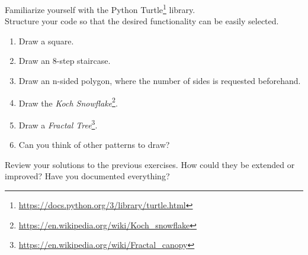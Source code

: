 \documentclass{config/minimal_uebungszettel}
\theoremstyle{definition}
\newcommand{\furl}[1]{\footnote{\url{#1}}}
\begin{document}
\medskip
\noindent {} \quad


    \noindent Familiarize yourself with the Python Turtle\furl{https://docs.python.org/3/library/turtle.html} library.\\
    Structure your code so that the desired functionality can be easily selected.
    \begin{enumerate}
        \item Draw a square.
        \item Draw an 8-step staircase.
        \item Draw an n-sided polygon, where the number of sides is requested beforehand.
        \item Draw the \textsl{Koch Snowflake}\furl{https://en.wikipedia.org/wiki/Koch_snowflake}.
        \item Draw a \textsl{Fractal Tree}\furl{https://en.wikipedia.org/wiki/Fractal_canopy}.
        \item Can you think of other patterns to draw?
        \noindent 
    \end{enumerate}

    \medskip
\noindent {} \quad
\noindent
    Review your solutions to the previous exercises. How could they be extended or improved? Have you documented everything?
\end{document}
